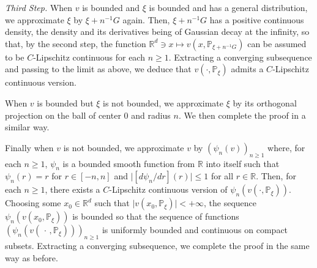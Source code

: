 \documentclass[11pt]{amsart}
\begin{document}
\textit{Third Step.} When $v$ is bounded and $\xi$ is bounded and has a general distribution, we approximate $\xi$ by $\xi+n^{-1} G$ again. Then, 
$\xi + n^{-1} G$ has a positive continuous density, the density and its derivatives being of Gaussian decay at the infinity, so that, by the second step, the function ${\mathbb R}^d \ni x \mapsto v(x,{\mathbb P}_{\xi+n^{-1}G})$ 
can be assumed to be $C$-Lipschitz continuous for each $n\ge 1$. Extracting a converging subsequence and passing to the limit as above, we deduce that $v(\cdot,{\mathbb P}_{\xi})$ admits a $C$-Lipschitz continuous version. 

When $v$ is bounded but $\xi$ is not bounded, we approximate $\xi$ by its orthogonal projection on the ball of center $0$ and radius $n$. We then complete the proof in a similar way. 

Finally when $v$ is not bounded, we approximate $v$ by $(\psi_{n}(v))_{n \geq 1}$ where, for each $n \geq 1$, 
$\psi_{n}$ is a bounded smooth function from ${\mathbb R}$ into itself such that $\psi_{n}(r)=r$ for $r\in [-n,n]$ and $\vert [d\psi_{n}/dr](r) \vert \leq 1$ for all $r \in {\mathbb R}$. Then, for each $n \geq 1$, there exists a $C$-Lipschitz continuous 
version of $\psi_{n}(v(\cdot,{\mathbb P}_{\xi}))$. Choosing some $x_{0} \in {\mathbb R}^d$ such that $\vert v(x_{0},{\mathbb P}_{\xi}) \vert < + \infty$,  the sequence $\psi_{n}(v(x_{0},{\mathbb P}_{\xi}))$ is bounded so that the sequence of functions $(\psi_{n}(v( \, \cdot \, ,{\mathbb P}_{\xi})))_{n \geq 1}$ is uniformly bounded and continuous on compact subsets. Extracting a converging subsequence, we complete the proof in the same way as before. 
\end{document}

